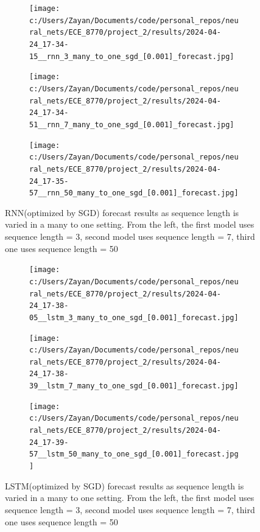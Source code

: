 \documentclass[12pt, letterpaper]{article}
\begin{document}
\begin{figure}[htpb]
    \centering
    \begin{subfigure}[b]{0.3\textwidth}
        \texttt{[image: c:/Users/Zayan/Documents/code/personal\_repos/neural\_nets/ECE\_8770/project\_2/results/2024-04-24\_17-34-15\_\_rnn\_3\_many\_to\_one\_sgd\_[0.001]\_forecast.jpg]}
    \end{subfigure}
    \begin{subfigure}[b]{0.3\textwidth}
        \texttt{[image: c:/Users/Zayan/Documents/code/personal\_repos/neural\_nets/ECE\_8770/project\_2/results/2024-04-24\_17-34-51\_\_rnn\_7\_many\_to\_one\_sgd\_[0.001]\_forecast.jpg]}
    \end{subfigure}
    \begin{subfigure}[b]{0.3\textwidth}
        \texttt{[image: c:/Users/Zayan/Documents/code/personal\_repos/neural\_nets/ECE\_8770/project\_2/results/2024-04-24\_17-35-57\_\_rnn\_50\_many\_to\_one\_sgd\_[0.001]\_forecast.jpg]}
    \end{subfigure}
    \caption{RNN(optimized by SGD) forecast results as sequence length is varied in a many to one setting. From 
    the left, the first model uses sequence length = 3, second model uses sequence length = 7, third one uses sequence length = 50}
    \label{fig: SGD-RNN forecast results as sequence length is varied in a many-to-one setting}
\end{figure}

\begin{figure}[htpb]
    \centering
    \begin{subfigure}[b]{0.3\textwidth}
        \texttt{[image: c:/Users/Zayan/Documents/code/personal\_repos/neural\_nets/ECE\_8770/project\_2/results/2024-04-24\_17-38-05\_\_lstm\_3\_many\_to\_one\_sgd\_[0.001]\_forecast.jpg]}
    \end{subfigure}
    \begin{subfigure}[b]{0.3\textwidth}
        \texttt{[image: c:/Users/Zayan/Documents/code/personal\_repos/neural\_nets/ECE\_8770/project\_2/results/2024-04-24\_17-38-39\_\_lstm\_7\_many\_to\_one\_sgd\_[0.001]\_forecast.jpg]}
    \end{subfigure}
    \begin{subfigure}[b]{0.3\textwidth}
        \texttt{[image: c:/Users/Zayan/Documents/code/personal\_repos/neural\_nets/ECE\_8770/project\_2/results/2024-04-24\_17-39-57\_\_lstm\_50\_many\_to\_one\_sgd\_[0.001]\_forecast.jpg]}
    \end{subfigure}
    \caption{LSTM(optimized by SGD) forecast results as sequence length is varied in a many to one setting. From 
    the left, the first model uses sequence length = 3, second model uses sequence length = 7, third one uses sequence length = 50}
    \label{fig: SGD-LSTM forecast results as sequence length is varied in a many-to-one setting}
\end{figure}
\end{document}
